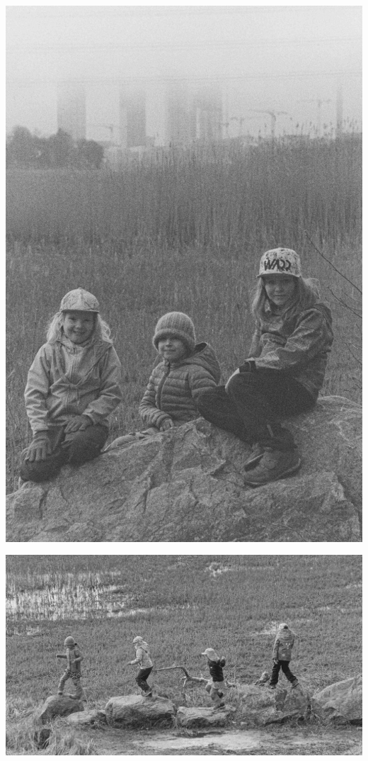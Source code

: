 \begin{multicols}{2}
	\vspace*{0.16cm}
	\begin{center}
		\noindent\includegraphics[width=0.8\linewidth]{assets/kolkkienpäiväretkibw13}
	\end{center}


\end{multicols}

\vspace*{-0.32cm}
\begin{center}
	\noindent\includegraphics[width=0.8\linewidth]{assets/kolkkienpäiväretkibw3}
\end{center}


